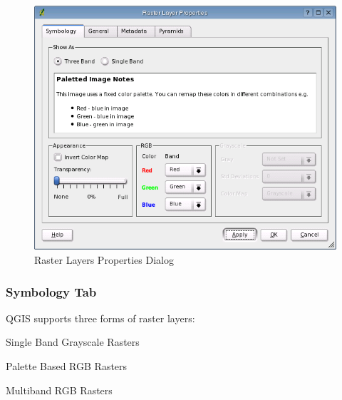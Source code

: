 \begin{figure}[h]
   \begin{center}
   \caption{Raster Layers Properties Dialog}\label{fig:raster_properties}\smallskip
   \includegraphics[scale=.7]{qgis_user_guide_images/raster_properties}
\end{center}  
\end{figure}


\subsubsection{Symbology Tab}


QGIS supports three forms of raster layers:
\begin{compactitem}
\item Single Band Grayscale Rasters
\item Palette Based RGB Rasters
\item Multiband RGB Rasters
\end{compactitem}

